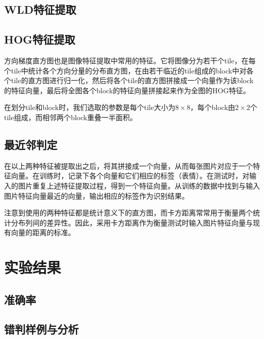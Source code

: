 \documentclass[UTF8]{ctexart}
\begin{document}
\subsection{WLD特征提取}

\subsection{HOG特征提取}

方向梯度直方图也是图像特征提取中常用的特征。它将图像分为若干个tile，在每个tile中统计各个方向分量的分布直方图，在由若干临近的tile组成的block中对各个tile的直方图进行归一化，然后将各个tile的直方图拼接成一个向量作为该block的特征向量，最后将全图各个block的特征向量拼接起来作为全图的HOG特征。

在划分tile和block时，我们选取的参数是每个tile大小为$8\times 8$，每个block由$2\times 2$个tile组成，而相邻两个block重叠一半面积。

\subsection{最近邻判定}

在以上两种特征被提取出之后，将其拼接成一个向量，从而每张图片对应于一个特征向量。在训练时，记录下各个向量和它们相应的标签（表情）。在测试时，对输入的图片重复上述特征提取过程，得到一个特征向量。从训练的数据中找到与输入图片特征向量最近的向量，输出相应的标签作为识别结果。

注意到使用的两种特征都是统计意义下的直方图，而卡方距离常常用于衡量两个统计分布列间的差异性。因此，采用卡方距离作为衡量测试时输入图片特征向量与现有向量的距离的标准。

\section{实验结果}

\subsection{准确率}

%
%

\subsection{错判样例与分析}
\end{document}
